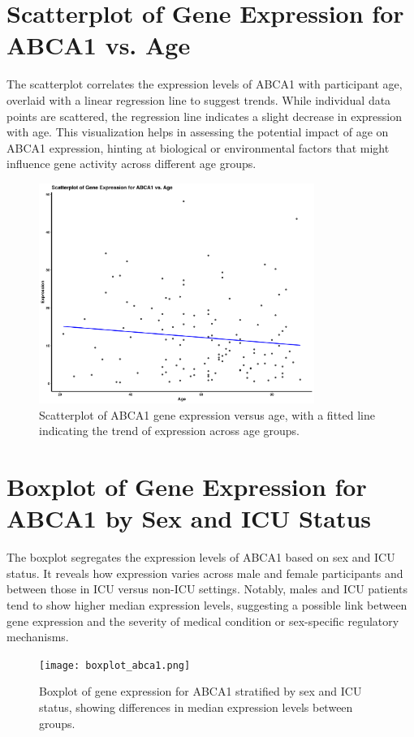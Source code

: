 \documentclass{article}
\begin{document}
\section{Scatterplot of Gene Expression for ABCA1 vs. Age}
The scatterplot correlates the expression levels of ABCA1 with participant age, overlaid with a linear regression line to suggest trends. While individual data points are scattered, the regression line indicates a slight decrease in expression with age. This visualization helps in assessing the potential impact of age on ABCA1 expression, hinting at biological or environmental factors that might influence gene activity across different age groups. 

\begin{figure}[H]
\centering
\includegraphics[width=0.8\textwidth]{scatterplot_abca1.png}
\caption{Scatterplot of ABCA1 gene expression versus age, with a fitted line indicating the trend of expression across age groups.}
\end{figure}
\newpage
\section{Boxplot of Gene Expression for ABCA1 by Sex and ICU Status}
The boxplot segregates the expression levels of ABCA1 based on sex and ICU status. It reveals how expression varies across male and female participants and between those in ICU versus non-ICU settings. Notably, males and ICU patients tend to show higher median expression levels, suggesting a possible link between gene expression and the severity of medical condition or sex-specific regulatory mechanisms.

\begin{figure}[H]
\centering
\texttt{[image: boxplot\_abca1.png]}
\caption{Boxplot of gene expression for ABCA1 stratified by sex and ICU status, showing differences in median expression levels between groups.}
\end{figure}
\newpage
\end{document}
